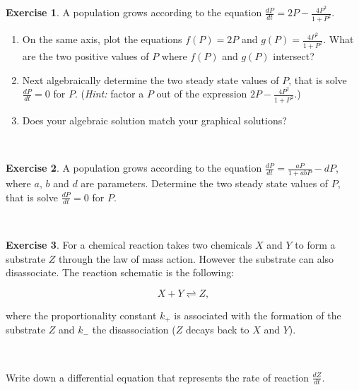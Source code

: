 \documentclass[
]{book}
\theoremstyle{definition}
\theoremstyle{definition}
\theoremstyle{definition}
\newtheorem{exercise}{Exercise}[chapter]
\theoremstyle{remark}
\begin{document}
\begin{exercise}
\protect\hypertarget{exr:unnamed-chunk-56}{}{\label{exr:unnamed-chunk-56} }A population grows according to the equation \(\displaystyle \frac{dP}{dt} = 2P - \frac{4P^{2}}{1+P^{2}}\).

\begin{enumerate}[label=\alph*.]
\item On the same axis, plot the equations $\displaystyle f(P) = 2P$ and $\displaystyle g(P)=\frac{4P^{2}}{1+P^{2}}$.  What are the two positive values of $P$ where $f(P)$ and $g(P)$ intersect?
\item Next algebraically determine the two steady state values of $P$, that is solve $\displaystyle \frac{dP}{dt}=0$ for $P$.  (\emph{Hint:} factor a $P$ out of the expression $\displaystyle 2P - \frac{4P^{2}}{1+P^{2}}$.)
\item Does your algebraic solution match your graphical solutions?
\end{enumerate}
\end{exercise}

~

\begin{exercise}
\protect\hypertarget{exr:unnamed-chunk-57}{}{\label{exr:unnamed-chunk-57} }A population grows according to the equation \(\displaystyle \frac{dP}{dt} = \frac{aP}{1+abP} - dP\), where \(a\), \(b\) and \(d\) are parameters. Determine the two steady state values of \(P\), that is solve \(\displaystyle \frac{dP}{dt}=0\) for \(P\).
\end{exercise}
~
\begin{exercise}
\protect\hypertarget{exr:unnamed-chunk-58}{}{\label{exr:unnamed-chunk-58} }For a chemical reaction takes two chemicals \(X\) and \(Y\) to form a substrate \(Z\) through the law of mass action. However the substrate can also disassociate. The reaction schematic is the following:

\begin{equation}
X + Y \rightleftharpoons Z,
\end{equation}

where the proportionality constant \(k_+\) is associated with the formation of the substrate \(Z\) and \(k_-\) the disassociation (\(Z\) decays back to \(X\) and \(Y\)).

~

Write down a differential equation that represents the rate of reaction \(\displaystyle \frac{dZ}{dt}\).
\end{exercise}
\end{document}
